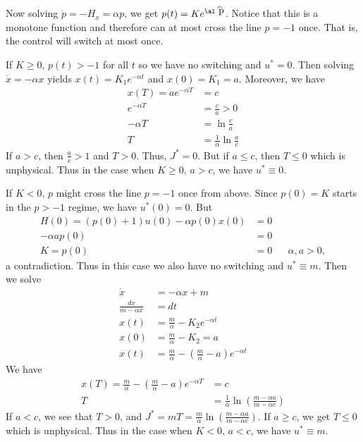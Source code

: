 \documentclass[12pt]{article}
\begin{document}
\begin{problem}[3]
Now solving $ \dot{p} = -H_x = \alpha p$, we get $ p(t) = K e^{ \al\wh{ p}}$. Notice that this is a monotone function and therefore can at most cross the line $ p=-1$ once. That is, the control will switch at most once.
\begin{case}[1]
If $ K \geq 0$,  $ p(t) > -1$ for all  $ t$ so we have no switching and  $ u^* =0$. Then solving $ \dot{x} = - \alpha x $ yields $ x(t) = K_1 e^{- \alpha t}$ and $ x(0) = K_1 = a$. Moreover, we have
\begin{align*}
	x(T) = a e^{- \alpha T} &= c \\
	e^{- \alpha T} &= \frac{c}{a} >0 \\
	- \alpha T &= \ln \frac{c}{a} \\
	T &=  \frac{1}{ \alpha} \ln \frac{a}{c} 
\end{align*}
If $ a>c$, then  $ \frac{a}{c}>1$ and $ T >0$. Thus, $J^* = 0 $. But if $ a\leq c$, then  $ T \leq 0$ which is unphysical. Thus in the case when $ K \geq 0$, $ a>c$, we have $ u^* \equiv 0$.
\end{case}
\begin{case}[2]
If $ K < 0$,  $ p$ might cross the line  $ p=-1$ once from above. Since $ p(0) = K$ starts in the $ p>-1$ regime, we have $ u^*(0) = 0$. But
\begin{align*}
	H(0) = (p(0)+1) u(0) - \alpha p(0) x(0) &= 0 \\
	- \alpha a p(0) &= 0 \\
	K=p(0) &= 0 && \alpha, a>0,
\end{align*}
a contradiction. Thus in this case we also have no switching and $ u^*  \equiv m$. Then we solve
\begin{align*}
	\dot{x} &= - \alpha x+m \\
\frac{dx}{m- \alpha x} &=  dt \\
x(t) &= \frac{m}{ \alpha} - K_2 e^{- \alpha t} \\
x(0) &= \frac{m}{ \alpha} - K_2 = a \\
x(t) &=  \frac{m}{ \alpha} - \left( \frac{m}{ \alpha}-a \right) e^{- \alpha t}  
\end{align*}
We have
\begin{align*}
	x(T) = \frac{m}{ \alpha} - \left(  \frac{m}{ \alpha} - a \right) e^{- \alpha T} &= c \\
	T &=  \frac{1}{ \alpha} \ln \left( \frac{m- \alpha a}{m- \alpha c } \right)  
\end{align*}
If $ a<c$, we see that  $ T>0$, and  $ J^*  = m T = \frac{m}{ \alpha} \ln \left( \frac{m- \alpha a}{ m- \alpha c} \right) $. If $ a \geq c$, we get  $ T \leq 0$ which is unphysical. Thus in the case when  $ K<0$,  $ a<c$, we have  $ u^*  \equiv m$.
\end{case}
\end{problem}
\end{document}
